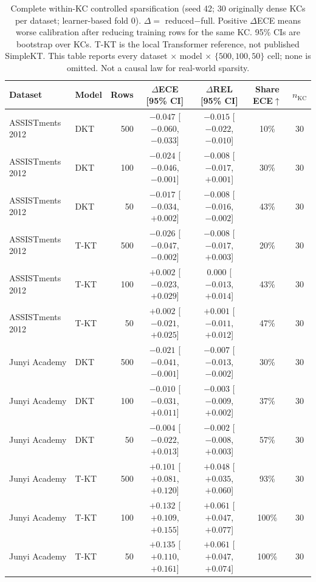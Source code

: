 \begin{table}[htbp]
\caption{Complete within-KC controlled sparsification (seed 42; 30 originally dense KCs per dataset; learner-based fold 0). $\Delta=$ reduced$-$full. Positive $\Delta$ECE means worse calibration after reducing training rows for the same KC. 95\% CIs are bootstrap over KCs. T-KT is the local Transformer reference, not published SimpleKT. This table reports every dataset $\times$ model $\times$ $\{500,100,50\}$ cell; none is omitted. Not a causal law for real-world sparsity.}
\label{tab:s2_controlled_sparsification}
\centering\scriptsize
\begin{tabular}{llrcccc}
\toprule
Dataset & Model & Rows & $\Delta$ECE [95\% CI] & $\Delta$REL [95\% CI] & Share ECE$\uparrow$ & $n_{\mathrm{KC}}$ \\
\midrule
ASSISTments 2012 & DKT & 500 & $-0.047$ [$-0.060$, $-0.033$] & $-0.015$ [$-0.022$, $-0.010$] & 10\% & 30 \\
ASSISTments 2012 & DKT & 100 & $-0.024$ [$-0.046$, $-0.001$] & $-0.008$ [$-0.017$, $+0.001$] & 30\% & 30 \\
ASSISTments 2012 & DKT & 50 & $-0.017$ [$-0.034$, $+0.002$] & $-0.008$ [$-0.016$, $-0.002$] & 43\% & 30 \\
ASSISTments 2012 & T-KT & 500 & $-0.026$ [$-0.047$, $-0.002$] & $-0.008$ [$-0.017$, $+0.003$] & 20\% & 30 \\
ASSISTments 2012 & T-KT & 100 & $+0.002$ [$-0.023$, $+0.029$] & $0.000$ [$-0.013$, $+0.014$] & 43\% & 30 \\
ASSISTments 2012 & T-KT & 50 & $+0.002$ [$-0.021$, $+0.025$] & $+0.001$ [$-0.011$, $+0.012$] & 47\% & 30 \\
\midrule
Junyi Academy & DKT & 500 & $-0.021$ [$-0.041$, $-0.001$] & $-0.007$ [$-0.013$, $-0.002$] & 30\% & 30 \\
Junyi Academy & DKT & 100 & $-0.010$ [$-0.031$, $+0.011$] & $-0.003$ [$-0.009$, $+0.002$] & 37\% & 30 \\
Junyi Academy & DKT & 50 & $-0.004$ [$-0.022$, $+0.013$] & $-0.002$ [$-0.008$, $+0.003$] & 57\% & 30 \\
Junyi Academy & T-KT & 500 & $+0.101$ [$+0.081$, $+0.120$] & $+0.048$ [$+0.035$, $+0.060$] & 93\% & 30 \\
Junyi Academy & T-KT & 100 & $+0.132$ [$+0.109$, $+0.155$] & $+0.061$ [$+0.047$, $+0.077$] & 100\% & 30 \\
Junyi Academy & T-KT & 50 & $+0.135$ [$+0.110$, $+0.161$] & $+0.061$ [$+0.047$, $+0.074$] & 100\% & 30 \\

\end{tabular}
\end{table}

